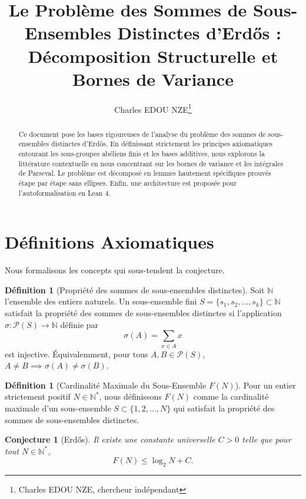 \documentclass[12pt, a4paper, french]{article}
\title{Le Problème des Sommes de Sous-Ensembles Distinctes d'Erd\H{o}s : \\ Décomposition Structurelle et Bornes de Variance}
\author{Charles EDOU NZE\thanks{Charles EDOU NZE, chercheur indépendant}}
\date{}
\newtheorem{conjecture}[theorem]{Conjecture}
\theoremstyle{definition}
\newtheorem{definition}[theorem]{Définition}
\begin{document}
\maketitle

\begin{abstract}
Ce document pose les bases rigoureuses de l'analyse du problème des sommes de sous-ensembles distinctes d'Erd\H{o}s. En définissant strictement les principes axiomatiques entourant les sous-groupes abéliens finis et les bases additives, nous explorons la littérature contextuelle en nous concentrant sur les bornes de variance et les intégrales de Parseval. Le problème est décomposé en lemmes hautement spécifiques prouvés étape par étape sans ellipses. Enfin, une architecture est proposée pour l'autoformalisation en Lean 4.
\end{abstract}

\tableofcontents
\newpage

\section{Définitions Axiomatiques}
Nous formalisons les concepts qui sous-tendent la conjecture.

\begin{definition}[Propriété des sommes de sous-ensembles distinctes]
Soit $\mathbb{N}$ l'ensemble des entiers naturels. Un sous-ensemble fini $S = \{s_1, s_2, \dots, s_k\} \subset \mathbb{N}$ satisfait la propriété des sommes de sous-ensembles distinctes si l'application $\sigma : \mathcal{P}(S) \to \mathbb{N}$ définie par
$$ \sigma(A) = \sum_{x \in A} x $$
est injective. Équivalemment, pour tous $A, B \in \mathcal{P}(S)$, $A \neq B \implies \sigma(A) \neq \sigma(B)$.
\end{definition}

\begin{definition}[Cardinalité Maximale du Sous-Ensemble $F(N)$]
Pour un entier strictement positif $N \in \mathbb{N}^*$, nous définissons $F(N)$ comme la cardinalité maximale d'un sous-ensemble $S \subset \{1, 2, \dots, N\}$ qui satisfait la propriété des sommes de sous-ensembles distinctes.
\end{definition}

\begin{conjecture}[Erd\H{o}s]
Il existe une constante universelle $C > 0$ telle que pour tout $N \in \mathbb{N}^*$,
$$ F(N) \le \log_2 N + C. $$
\end{conjecture}
\end{document}

